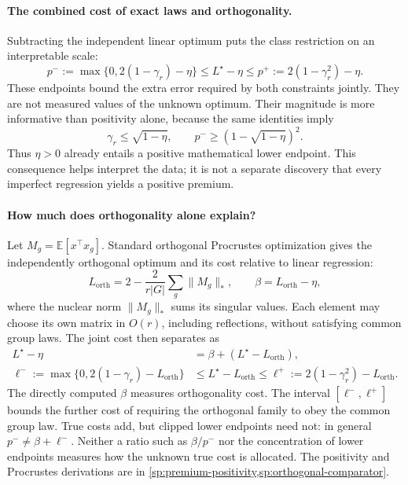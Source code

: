 \paragraph{The combined cost of exact laws and orthogonality.}
Subtracting the independent linear optimum puts the class restriction on an interpretable scale:
\begin{equation}
 p^-:=\max\{0,2(1-\gamma_r)-\eta\}
 \le L^\star-\eta\le
 p^+:=2(1-\gamma_r^2)-\eta.
 \label{eq:risk-premium-main}
\end{equation}
These endpoints bound the extra error required by both constraints jointly. They are not measured values of the unknown optimum. Their magnitude is more informative than positivity alone, because the same identities imply
\begin{equation}
 \gamma_r\le\sqrt{1-\eta},\qquad
 p^-\ge(1-\sqrt{1-\eta})^2.
 \label{eq:positivity-main}
\end{equation}
Thus $\eta>0$ already entails a positive mathematical lower endpoint. This consequence helps interpret the data; it is not a separate discovery that every imperfect regression yields a positive premium.

\paragraph{How much does orthogonality alone explain?}
Let $M_g=\mathbb E[x^\top x_g]$. Standard orthogonal Procrustes optimization gives the independently orthogonal optimum and its cost relative to linear regression:
\[
 L_{\mathrm{orth}}=2-\frac{2}{r|G|}\sum_g\|M_g\|_*,\qquad
 \beta=L_{\mathrm{orth}}-\eta,
\]
where the nuclear norm $\|M_g\|_*$ sums its singular values. Each element may choose its own matrix in $O(r)$, including reflections, without satisfying common group laws. The joint cost then separates as
\begin{align*}
 L^\star-\eta&=\beta+(L^\star-L_{\mathrm{orth}}),\\
 \ell^-:=\max\{0,2(1-\gamma_r)-L_{\mathrm{orth}}\}
 &\le L^\star-L_{\mathrm{orth}}\le
 \ell^+:=2(1-\gamma_r^2)-L_{\mathrm{orth}}.
\end{align*}
The directly computed $\beta$ measures orthogonality cost. The interval $[\ell^-,\ell^+]$ bounds the further cost of requiring the orthogonal family to obey the common group law. True costs add, but clipped lower endpoints need not: in general $p^-\ne\beta+\ell^-$. Neither a ratio such as $\beta/p^-$ nor the concentration of lower endpoints measures how the unknown true cost is allocated. The positivity and Procrustes derivations are in \cref{sp:premium-positivity,sp:orthogonal-comparator}.


